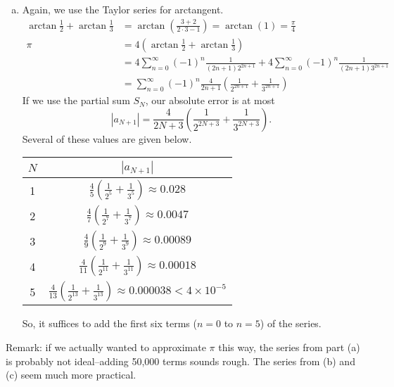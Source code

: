 \begin{solution}
\begin{enumerate}[(a)]
\item
Again, we use the Taylor series for arctangent.
\begin{align*}
	\arctan\frac12+\arctan\frac13&=\arctan\left(\frac{3+2}{2\cdot3-1}\right)=\arctan(1)=\frac{\pi}{4}\\
	\pi&=4\left(\arctan\frac12+\arctan\frac13 \right)\\
	&=4\sum_{n=0}^\infty (-1)^n\frac{1}{(2n+1)2^{2n+1}}+4\sum_{n=0}^\infty (-1)^n\frac{1}{(2n+1)3^{2n+1}}\\
	&=\sum_{n=0}^\infty (-1)^n\frac{4}{2n+1}\left(\frac{1}{2^{2n+1}}+\frac{1}{3^{2n+1}} \right)
	\end{align*}
If we use the partial sum $S_N$, our absolute error is at most \[|a_{N+1}|=\dfrac{4}{2N+3}\left(\dfrac{1}{2^{2N+3}}+\dfrac{1}{3^{2N+3}} \right).\] Several of these values are given below.
\begin{center}
	\begin{tabular}{|c|c|}
		\hline
		$N$&$|a_{N+1}|$\\ \hline
		1 & $\displaystyle \frac{4}{5}\left(\frac{1}{2^5}+\frac{1}{3^5} \right)\approx 0.028$\\
		\hline
		2 & $\displaystyle\frac{4}{7}\left(\frac{1}{2^7}+\frac{1}{3^7} \right)\approx 0.0047$\\
		\hline
		3 & $\displaystyle\frac{4}{9}\left(\frac{1}{2^9}+\frac{1}{3^9} \right)\approx 0.00089$\\
\hline
		4 & $\displaystyle\frac{4}{11}\left(\frac{1}{2^{11}}+\frac{1}{3^{11}} \right)\approx 0.00018$\\
\hline		5 & $\displaystyle\frac{4}{13}\left(\frac{1}{2^{13}}+\frac{1}{3^{13}} \right)\approx 0.000038<4\times10^{-5}$\\
\hline
	\end{tabular}
\end{center}
So, it suffices to add the first six terms ($n=0$ to $n=5$) of the series.
\end{enumerate}

Remark: if we actually wanted to approximate $\pi$ this way, the series from part (a) is probably not ideal--adding 50,000 terms sounds rough. The series from (b) and (c) seem much more practical.
\end{solution}

